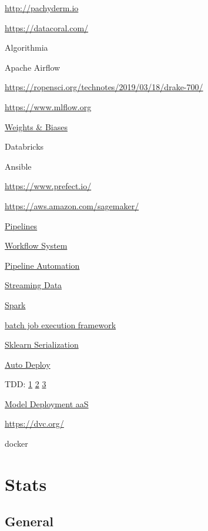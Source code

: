 \documentclass[]{book}
\begin{document}
\url{http://pachyderm.io}

\url{https://datacoral.com/}

Algorithmia

Apache Airflow

\url{https://ropensci.org/technotes/2019/03/18/drake-700/}

\url{https://www.mlflow.org}

\href{https://www.wandb.com/blog/towards-reproducibility}{Weights \&
Biases}

Databricks

Ansible

\url{https://www.prefect.io/}

\url{https://aws.amazon.com/sagemaker/}

\href{http://stat545.com/automation01_slides/\#/automating-data-analysis-pipelines}{Pipelines}

\href{https://snakemake.readthedocs.io/en/stable/}{Workflow System}

\href{http://stat545.com/automation01_slides/\#/automating-data-analysis-pipelines}{Pipeline
Automation}

\href{https://www.wallaroolabs.com}{Streaming Data}

\href{https://docs.azuredatabricks.net/spark/latest/mllib/mllib-pipelines-and-stuctured-streaming.html}{Spark}

\href{https://stitchfix.github.io/flotilla-os/}{batch job execution
framework}

\href{https://cmry.github.io/notes/serialize}{Sklearn Serialization}

\href{http://content.nexosis.com/twimlai}{Auto Deploy}

TDD:
\href{http://engineering.pivotal.io/post/test-driven-development-for-data-science/}{1}
\textbar{} \href{http://www.tdda.info/}{2} \textbar{}
\href{http://stochasticsolutions.com/}{3}

\href{https://orchestrahq.com}{Model Deployment aaS}

\url{https://dvc.org/}

docker

\chapter{Stats}\label{stats}

\section{General}\label{general-7}
\end{document}
